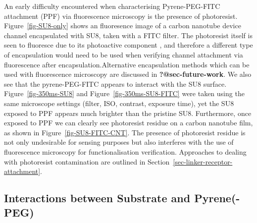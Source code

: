 \documentclass[
  a4paper,
]{scrbook}
\begin{document}
An early difficulty encountered when characterising Pyrene-PEG-FITC
attachment (PPF) via fluorescence microscopy is the presence of
photoresist. Figure~\ref{fig-SU8-only} shows an fluoresence image of a
carbon nanotube device channel encapsulated with SU8, taken with a FITC
filter. The photoresist itself is seen to fluoresce due to its
photoactive component \autocite{Pai2007}, and therefore a different type
of encapsulation would need to be used when verifying channel attachment
via fluorescence after encapsulation.Alternative encapsulation methods
which can be used with fluorescence microscopy are discussed in
\textbf{?@sec-future-work}. We also see that the pyrene-PEG-FITC appears
to interact with the SU8 surface. Figure~\ref{fig-350ms-SU8} and
Figure~\ref{fig-350ms-SU8-FITC} were taken using the same microscope
settings (filter, ISO, contrast, exposure time), yet the SU8 exposed to
PPF appears much brighter than the pristine SU8. Furthermore, once
exposed to PPF we can clearly see photoresist residue on a carbon
nanotube film, as shown in Figure~\ref{fig-SU8-FITC-CNT}. The presence
of photoresist residue is not only undesirable for sensing purposes but
also interferes with the use of fluorescence microscopy for
functionalisation verification. Approaches to dealing with photoresist
contamination are outlined in
Section~\ref{sec-linker-receptor-attachment}.

\hypertarget{sec-pyrene-interactions}{%
\subsection{Interactions between Substrate and
Pyrene(-PEG)}\label{sec-pyrene-interactions}}
\end{document}
